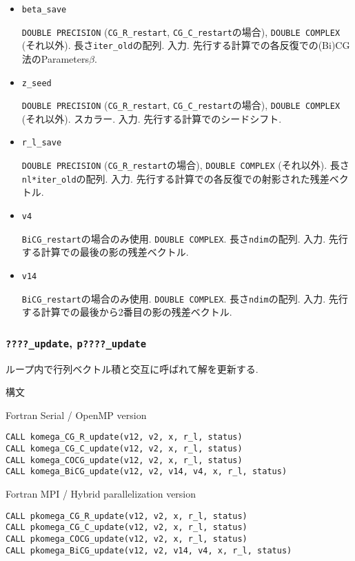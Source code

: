 \documentclass[12pt,titlepage]{article}
\begin{document}
\begin{itemize}
\item \verb|beta_save|

  \verb|DOUBLE PRECISION| (\verb|CG_R_restart|, \verb|CG_C_restart|の場合),
  \verb|DOUBLE COMPLEX| (それ以外).
  長さ\verb|iter_old|の配列. 入力. 先行する計算での各反復での(Bi)CG法のParameters$\beta$.

\item \verb|z_seed|

  \verb|DOUBLE PRECISION| (\verb|CG_R_restart|, \verb|CG_C_restart|の場合),
  \verb|DOUBLE COMPLEX| (それ以外).
  スカラー. 入力. 先行する計算でのシードシフト.

\item \verb|r_l_save|
  
  \verb|DOUBLE PRECISION| (\verb|CG_R_restart|の場合),
  \verb|DOUBLE COMPLEX| (それ以外).
  長さ\verb|nl*iter_old|の配列. 入力.
  先行する計算での各反復での射影された残差ベクトル.

\item \verb|v4|

  \verb|BiCG_restart|の場合のみ使用.
  \verb|DOUBLE COMPLEX|.
  長さ\verb|ndim|の配列. 入力.
  先行する計算での最後の影の残差ベクトル.

\item \verb|v14|

  \verb|BiCG_restart|の場合のみ使用.
  \verb|DOUBLE COMPLEX|.
  長さ\verb|ndim|の配列. 入力.
  先行する計算での最後から2番目の影の残差ベクトル.

\end{itemize}

\subsubsection{\texttt{????\_update}, \texttt{p????\_update}}

ループ内で行列ベクトル積と交互に呼ばれて解を更新する.

\noindent 構文

\noindent Fortran Serial / OpenMP version
\begin{verbatim}
CALL komega_CG_R_update(v12, v2, x, r_l, status)
CALL komega_CG_C_update(v12, v2, x, r_l, status)
CALL komega_COCG_update(v12, v2, x, r_l, status)
CALL komega_BiCG_update(v12, v2, v14, v4, x, r_l, status)
\end{verbatim}

\noindent Fortran MPI / Hybrid parallelization version
\begin{verbatim}
CALL pkomega_CG_R_update(v12, v2, x, r_l, status)
CALL pkomega_CG_C_update(v12, v2, x, r_l, status)
CALL pkomega_COCG_update(v12, v2, x, r_l, status)
CALL pkomega_BiCG_update(v12, v2, v14, v4, x, r_l, status)
\end{verbatim}
\end{document}
